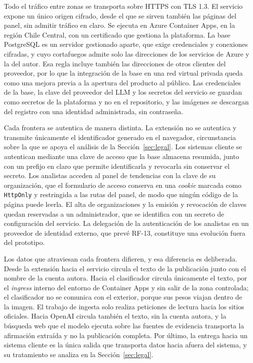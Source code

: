 Todo el tráfico entre zonas se transporta sobre HTTPS con TLS 1.3. El servicio expone un único origen cifrado, desde el que se sirven también las páginas del panel, sin admitir tráfico en claro. Se ejecuta en Azure Container Apps, en la región Chile Central, con un certificado que gestiona la plataforma. La base PostgreSQL es un servidor gestionado aparte, que exige credenciales y conexiones cifradas, y cuyo cortafuegos admite solo las direcciones de los servicios de Azure y la del autor. Esa regla incluye también las direcciones de otros clientes del proveedor, por lo que la integración de la base en una red virtual privada queda como una mejora previa a la apertura del producto al público. Las credenciales de la base, la clave del proveedor del LLM y los secretos del servicio se guardan como secretos de la plataforma y no en el repositorio, y las imágenes se descargan del registro con una identidad administrada, sin contraseña.

Cada frontera se autentica de manera distinta. La extensión no se autentica y transmite únicamente el identificador generado en el navegador, circunstancia sobre la que se apoya el análisis de la Sección~\ref{sec:legal}. Los sistemas cliente se autentican mediante una clave de acceso que la base almacena resumida, junto con un prefijo en claro que permite identificarla y revocarla sin conservar el secreto. Los analistas acceden al panel de tendencias con la clave de su organización, que el formulario de acceso conserva en una \textit{cookie} marcada como \texttt{HttpOnly} y restringida a las rutas del panel, de modo que ningún código de la página puede leerla. El alta de organizaciones y la emisión y revocación de claves quedan reservadas a un administrador, que se identifica con un secreto de configuración del servicio. La delegación de la autenticación de los analistas en un proveedor de identidad externo, que prevé RF-13, constituye una evolución fuera del prototipo.

Los datos que atraviesan cada frontera difieren, y esa diferencia es deliberada. Desde la extensión hacia el servicio circula el texto de la publicación junto con el nombre de la cuenta autora. Hacia el clasificador circula únicamente el texto, por el \textit{ingress} interno del entorno de Container Apps y sin salir de la zona controlada; el clasificador no se comunica con el exterior, porque sus pesos viajan dentro de la imagen. El trabajo de ingesta solo realiza peticiones de lectura hacia los sitios oficiales. Hacia OpenAI circula también el texto, sin la cuenta autora, y la búsqueda web que el modelo ejecuta sobre las fuentes de evidencia transporta la afirmación extraída y no la publicación completa. Por último, la entrega hacia un sistema cliente es la única salida que transporta datos hacia afuera del sistema, y su tratamiento se analiza en la Sección~\ref{sec:legal}.

